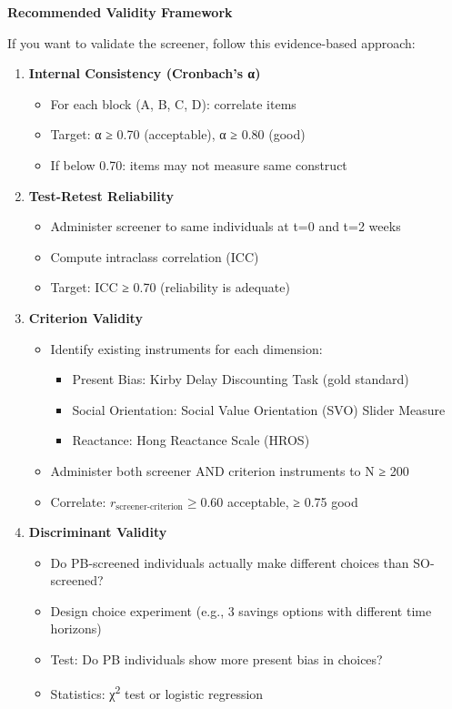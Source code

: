 \textbf{Recommended Validity Framework}

If you want to validate the screener, follow this evidence-based approach:

\begin{enumerate}
\item \textbf{Internal Consistency (Cronbach's α)}
  \begin{itemize}[nosep]
  \item For each block (A, B, C, D): correlate items
  \item Target: α ≥ 0.70 (acceptable), α ≥ 0.80 (good)
  \item If below 0.70: items may not measure same construct
  \end{itemize}

\item \textbf{Test-Retest Reliability}
  \begin{itemize}[nosep]
  \item Administer screener to same individuals at t=0 and t=2 weeks
  \item Compute intraclass correlation (ICC)
  \item Target: ICC ≥ 0.70 (reliability is adequate)
  \end{itemize}

\item \textbf{Criterion Validity}
  \begin{itemize}[nosep]
  \item Identify existing instruments for each dimension:
    \begin{itemize}[nosep]
    \item Present Bias: Kirby Delay Discounting Task (gold standard)
    \item Social Orientation: Social Value Orientation (SVO) Slider Measure
    \item Reactance: Hong Reactance Scale (HROS)
    \end{itemize}
  \item Administer both screener AND criterion instruments to N ≥ 200
  \item Correlate: $r_{\text{screener-criterion}} ≥ 0.60$ acceptable, ≥ 0.75 good
  \end{itemize}

\item \textbf{Discriminant Validity}
  \begin{itemize}[nosep]
  \item Do PB-screened individuals actually make different choices than SO-screened?
  \item Design choice experiment (e.g., 3 savings options with different time horizons)
  \item Test: Do PB individuals show more present bias in choices?
  \item Statistics: χ\textsuperscript{2} test or logistic regression
  \end{itemize}


\end{enumerate}
